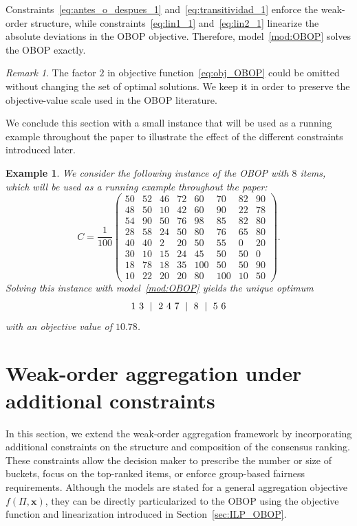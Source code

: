 \documentclass[pdflatex,basic,Numbered]{jnl}%
\theoremstyle{plain}
\newtheorem{example}{Example}
\theoremstyle{remark}
\newtheorem{remark}{Remark}
\theoremstyle{thmstyleone}%
\theoremstyle{thmstylethree}%
\begin{document}
Constraints~\eqref{eq:antes_o_despues_1} and~\eqref{eq:transitividad_1} enforce the weak-order structure, while constraints~\eqref{eq:lin1_1} and~\eqref{eq:lin2_1} linearize the absolute deviations in the OBOP objective. Therefore, model~\eqref{mod:OBOP} solves the OBOP exactly.

\begin{remark}
The factor \(2\) in objective function~\eqref{eq:obj_OBOP} could be omitted without changing the set of optimal solutions. We keep it in order to preserve the objective-value scale used in the OBOP literature.
\end{remark}

We conclude this section with a small instance that will be used as a running example throughout the paper to illustrate the effect of the different constraints introduced later.

\begin{example}\label{ex:ejemplo_1}
We consider the following instance of the {\rm OBOP} with \(8\) items, which will be used as a running example throughout the paper:
\[
C=\frac{1}{100}
\begin{pmatrix}
50 & 52 & 46 & 72 & 60 & 70 & 82 & 90 \\
48 & 50 & 10 & 42 & 60 & 90 & 22 & 78 \\
54 & 90 & 50 & 76 & 98 & 85 & 82 & 80 \\
28 & 58 & 24 & 50 & 80 & 76 & 65 & 80 \\
40 & 40 &  2 & 20 & 50 & 55 &  0 & 20 \\
30 & 10 & 15 & 24 & 45 & 50 & 50 &  0 \\
18 & 78 & 18 & 35 &100 & 50 & 50 & 90 \\
10 & 22 & 20 & 20 & 80 &100 & 10 & 50
\end{pmatrix}.
\]
Solving this instance with model~\eqref{mod:OBOP} yields the unique optimum
\[
{\rm 1\ 3\ \mid \ 2\ 4\ 7\ \mid \ 8\ \mid \ 5\ 6}
\]
with an objective value of \(10.78\).
\end{example}

\section{Weak-order aggregation under additional constraints}

In this section, we extend the weak-order aggregation framework by incorporating additional constraints on the structure and composition of the consensus ranking. These constraints allow the decision maker to prescribe the number or size of buckets, focus on the top-ranked items, or enforce group-based fairness requirements. Although the models are stated for a general aggregation objective \(f(\Pi,\bm{x})\), they can be directly particularized to the OBOP using the objective function and linearization introduced in Section~\ref{sec:ILP_OBOP}. 
\end{document}
